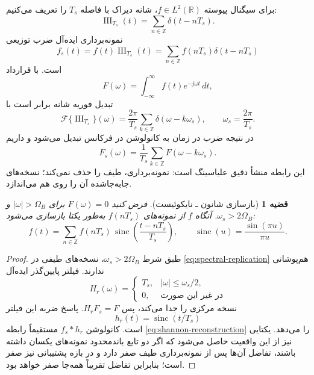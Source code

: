 \documentclass[12pt,openany,oneside]{book}
\newtheorem{theorem}{قضیه}[chapter]
\newcommand{\R}{\mathbb{R}}
\newcommand{\Z}{\mathbb{Z}}
\newcommand{\abs}[1]{\left\lvert #1\right\rvert}
\newcommand{\FT}{\mathcal{F}}
\newcommand{\sinc}{\operatorname{sinc}}
\begin{document}
برای سیگنال پیوسته \(f\in L^2(\R)\)، شانه دیراک با فاصله \(T_s\) را تعریف می‌کنیم:
\begin{equation}
\operatorname{III}_{T_s}(t)=\sum_{n\in\Z}\delta(t-nT_s).
\end{equation}
نمونه‌برداری ایده‌آل ضرب توزیعی
\begin{equation}
f_s(t)=f(t)\operatorname{III}_{T_s}(t)
=\sum_{n\in\Z}f(nT_s)\delta(t-nT_s)
\end{equation}
است. با قرارداد
\begin{equation}
F(\omega)=\int_{-\infty}^{\infty}f(t)e^{-j\omega t}\,dt,
\end{equation}
تبدیل فوریه شانه برابر است با
\begin{equation}
\FT\{\operatorname{III}_{T_s}\}(\omega)
=\frac{2\pi}{T_s}\sum_{k\in\Z}\delta(\omega-k\omega_s),
\qquad \omega_s=\frac{2\pi}{T_s}.
\end{equation}
در نتیجه ضرب در زمان به کانولوشن در فرکانس تبدیل می‌شود و داریم
\begin{equation}
F_s(\omega)=\frac{1}{T_s}\sum_{k\in\Z}F(\omega-k\omega_s).
\label{eq:spectral-replication}
\end{equation}
این رابطه منشأ دقیق علیاسینگ است: نمونه‌برداری، طیف را حذف نمی‌کند؛ نسخه‌های جابه‌جا‌شده آن را
روی هم می‌اندازد.

\begin{theorem}[بازسازی شانون ـ نایکوئیست]
فرض کنید \(F(\omega)=0\) برای \(\abs{\omega}>\Omega_B\) و
\(\omega_s>2\Omega_B\). آنگاه \(f\) از نمونه‌های \(f(nT_s)\) به‌طور یکتا بازسازی می‌شود:
\begin{equation}
f(t)=\sum_{n\in\Z} f(nT_s)\,
\sinc\!\left(\frac{t-nT_s}{T_s}\right),
\qquad
\sinc(u)=\frac{\sin(\pi u)}{\pi u}.
\label{eq:shannon-reconstruction}
\end{equation}
\end{theorem}

\begin{proof}
طبق شرط \(\omega_s>2\Omega_B\)، نسخه‌های طیفی در \eqref{eq:spectral-replication}
هم‌پوشانی ندارند. فیلتر پایین‌گذر ایده‌آل
\begin{equation}
H_r(\omega)=
\begin{cases}
T_s,&\abs{\omega}\le \omega_s/2,\\
0,&\text{در غیر این صورت}
\end{cases}
\end{equation}
نسخه مرکزی را جدا می‌کند، پس \(H_rF_s=F\). پاسخ ضربه این فیلتر
\begin{equation}
h_r(t)=\sinc(t/T_s)
\end{equation}
است. کانولوشن \(f_s*h_r\) مستقیماً رابطه \eqref{eq:shannon-reconstruction} را می‌دهد.
یکتایی نیز از این واقعیت حاصل می‌شود که اگر دو تابع باند‌محدود نمونه‌های یکسان داشته باشند،
تفاضل آن‌ها پس از نمونه‌برداری طیف صفر دارد و در بازه پشتیبانی نیز صفر است؛ بنابراین تفاضل
تقریباً همه‌جا صفر خواهد بود.
\end{proof}
\end{document}
